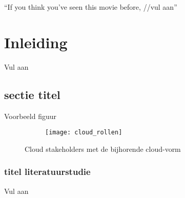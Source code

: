 \begin{savequote}[0.55\linewidth]
	``If you think you've seen this movie before, //vul aan''
\end{savequote}

\chapter*{Inleiding}
\label{chap:intro}

Vul aan
\section*{sectie titel}
\label{sec:what_is_cloud_computing}
Voorbeeld figuur

\begin{figure}
	\centering
	\begin{subfigure}{\textwidth}
		\centering
		\centerline{
			\texttt{[image: cloud\_rollen]}
		}
	\end{subfigure}
	\caption{Cloud stakeholders met de bijhorende cloud-vorm}
	\label{fig:cloud_rollen}
\end{figure}

\subsection*{titel literatuurstudie}
Vul aan